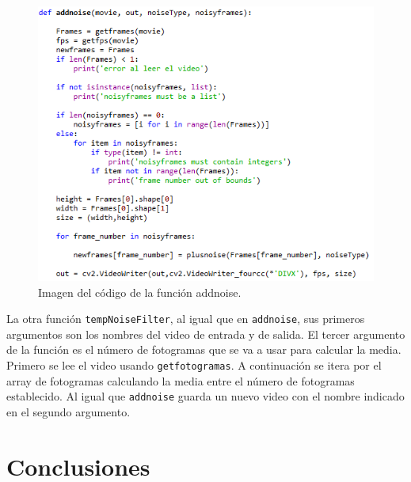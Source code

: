 \documentclass[a4paper,12pt]{report}
\begin{document}
\begin{figure}[h]
\centering
\includegraphics[width=1.0\textwidth]{imagenes/addnoise}
\caption{Imagen del código de la función addnoise.}
\label{addnoise} 
\end{figure}

La otra función \texttt{tempNoiseFilter}, al igual que en \texttt{addnoise}, sus primeros argumentos son los nombres del video de entrada y de salida. El tercer argumento de la función es el número de fotogramas que se va a usar para calcular la media. Primero se lee el video usando \texttt{getfotogramas}. A continuación se itera por el array de fotogramas calculando la media entre el número de fotogramas establecido. Al igual que \texttt{addnoise} guarda un nuevo video con el nombre indicado en el segundo argumento.\\


\chapter{Conclusiones}

\nocite{*}
\printbibliography[heading=bibintoc,title={Bibliography}]
\end{document}
